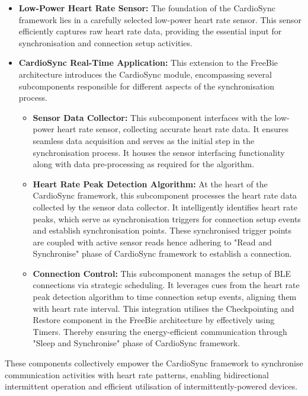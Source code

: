 \begin{itemize}
    \item \textbf{Low-Power Heart Rate Sensor:}
    The foundation of the CardioSync framework lies in a carefully selected low-power heart rate sensor. This sensor efficiently captures raw heart rate data, providing the essential input for synchronisation and connection setup activities.

    \item \textbf{CardioSync Real-Time Application:} This extension to the FreeBie architecture introduces the CardioSync module, encompassing several subcomponents responsible for different aspects of the synchronisation process.
    \begin{itemize}
        \item \textbf{Sensor Data Collector:} This subcomponent interfaces with the low-power heart rate sensor, collecting accurate heart rate data. It ensures seamless data acquisition and serves as the initial step in the synchronisation process. It houses the sensor interfacing functionality along with data pre-processing as required for the algorithm.
        
        \item \textbf{Heart Rate Peak Detection Algorithm:} At the heart of the CardioSync framework, this subcomponent processes the heart rate data collected by the sensor data collector. It intelligently identifies heart rate peaks, which serve as synchronisation triggers for connection setup events and establish synchronisation points. These synchronised trigger points are coupled with active sensor reads hence adhering to "Read and Synchronise" phase of CardioSync framework to establish a connection.
        
        \item \textbf{Connection Control:} This subcomponent manages the setup of BLE connections via strategic scheduling. It leverages cues from the heart rate peak detection algorithm to time connection setup events, aligning them with heart rate interval. This integration utilises the Checkpointing and Restore component in the FreeBie architecture by effectively using Timers. Thereby ensuring the energy-efficient communication through "Sleep and Synchronise" phase of CardioSync framework.
    \end{itemize}
\end{itemize}
\noindent These components collectively empower the CardioSync framework to synchronise communication activities with heart rate patterns, enabling bidirectional intermittent operation and efficient utilisation of intermittently-powered devices.

